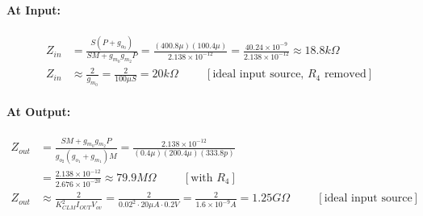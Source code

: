 \begin{enumerate}
    \paragraph{At Input:}
    \begin{align*}
      Z_{in} &= \frac{S (P + g_{o_0})}{S M + g_{m_0} g_{m_2} P} = \frac{(400.8 \mu)(100.4 \mu)}{2.138 \times 10^{-12}} = \frac{40.24 \times 10^{-9}}{2.138 \times 10^{-12}} \approx 18.8 k\Omega \\
      Z_{in} &\approx \frac{2}{g_{m_0}} = \frac{2}{100 \mu S} = 20 k\Omega \hspace{1cm} [\text{ideal input source, } R_4 \text{ removed}]
    \end{align*}
    \paragraph{At Output:}
    \begin{align*}
      Z_{out} &= \frac{S M + g_{m_0} g_{m_2} P}{g_{o_2} (g_{o_1} + g_{m_1}) M} = \frac{2.138 \times 10^{-12}}{(0.4 \mu)(200.4 \mu)(333.8 p)} \\
              &= \frac{2.138 \times 10^{-12}}{2.676 \times 10^{-20}} \approx 79.9 M\Omega \hspace{1cm} [\text{with } R_4] \\
      Z_{out} &\approx \frac{2}{K_{CLM}^2 I_{OUT} V_{ov}} = \frac{2}{0.02^2 \cdot 20 \mu A \cdot 0.2 V} = \frac{2}{1.6 \times 10^{-9} A} = 1.25 G\Omega \hspace{1cm} [\text{ideal input source}]
    \end{align*}
\end{enumerate}

